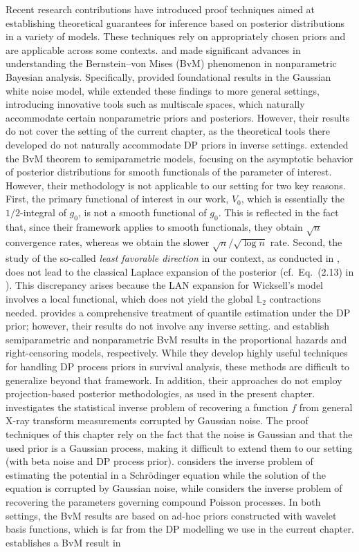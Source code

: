 Recent research contributions \cite{62,35,37,41,36,44,38,39,40,42,26,43} have introduced proof techniques aimed at establishing theoretical guarantees for inference based on posterior distributions in a variety of models. These techniques rely on appropriately chosen priors and are applicable across some contexts. \cite{62} and \cite{35} made significant advances in understanding the Bernstein--von Mises (BvM) phenomenon in nonparametric Bayesian analysis. Specifically, \cite{62} provided foundational results in the Gaussian white noise model, while \cite{35} extended these findings to more general settings, introducing innovative tools such as multiscale spaces, which naturally accommodate certain nonparametric priors and posteriors. However, their results do not cover the setting of the current chapter, as the theoretical tools there developed do not naturally accommodate DP priors in inverse settings. \cite{37} extended the BvM theorem to semiparametric models, focusing on the asymptotic behavior of posterior distributions for smooth functionals of the parameter of interest. However, their methodology is not applicable to our setting for two key reasons. First, the primary functional of interest in our work, $V_0$, which is essentially the $1/2$-integral of $g_0$, is not a smooth functional of $g_0$. This is reflected in the fact that, since their framework applies to smooth functionals, they obtain $\sqrt{n}$ convergence rates, whereas we obtain the slower $\sqrt{n} / \sqrt{\log{n}}$ rate. Second, the study of the so-called \textit{least favorable direction} in our context, as conducted in \cite{27}, does not lead to the classical Laplace expansion of the posterior (cf.\ Eq.\ (2.13) in \cite{37}). This discrepancy arises because the LAN expansion for Wicksell's model involves a local functional, which does not yield the global $\mathbb{L}_2$ contractions needed. \cite{41} provides a comprehensive treatment of quantile estimation under the DP prior; however, their results do not involve any inverse setting. \cite{36} and \cite{44} establish semiparametric and nonparametric BvM results in the proportional hazards and right-censoring models, respectively. While they develop highly useful techniques for handling DP process priors in survival analysis, these methods are difficult to generalize beyond that framework. In addition, their approaches do not employ projection-based posterior methodologies, as used in the present chapter. \cite{38} investigates the statistical inverse problem of recovering a function $f$ from general X-ray transform measurements corrupted by Gaussian noise. The proof techniques of this chapter rely on the fact that the noise is Gaussian and that the used prior is a Gaussian process, making it difficult to extend them to our setting (with beta noise and DP process prior). \cite{39} considers the inverse problem of estimating the potential in a Schr\"{o}dinger equation while the solution of the equation is corrupted by Gaussian noise, while \cite{40} considers the inverse problem of recovering the parameters governing compound Poisson processes. In both settings, the BvM results are based on ad-hoc priors constructed with wavelet basis functions, which is far from the DP modelling we use in the current chapter. \cite{42} establishes a BvM result in 